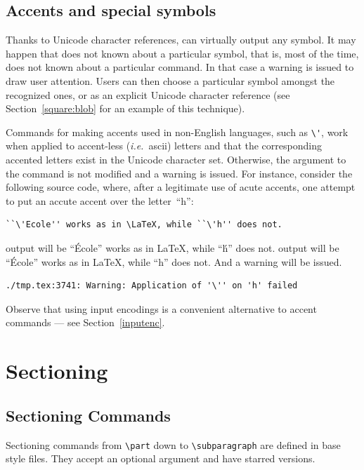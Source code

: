 \subsection{Accents\label{accents} and special symbols}
Thanks to Unicode character references, \hevea{} can virtually output
any symbol.
It may happen that \hevea{} does not known about a particular symbol,
that is, most of the time, \hevea{} does not known about a particular
command. In that case a warning is issued to draw user attention.
Users can then choose a particular symbol amongst the recognized ones,
or as an explicit Unicode character reference (see
Section~\ref{square:blob} for an example of this technique).

Commands for making accents used in non-English languages, such as
\verb+\'+, work when applied to accent-less (\emph{i.e.}\ ascii)
letters and that the corresponding accented letters exist
in the Unicode character set.
Otherwise, the argument to the command is not modified
and a warning is issued.
For instance, consider the following source code, where, after a
legitimate use of acute accents, one attempt to put an accute accent
over the letter~``h'':
\begin{verbatim}
``\'Ecole'' works as in \LaTeX, while ``\'h'' does not.
\end{verbatim}
\ifhevea
\hevea{} output will be ``\'Ecole'' works as in \LaTeX, while ``\'h'' does not.
\else
\hevea{} output will  be ``\'Ecole'' works as in \LaTeX, while ``h'' does not.
\fi{}
And a warning will be issued.
\begin{verbatim}
./tmp.tex:3741: Warning: Application of '\'' on 'h' failed
\end{verbatim}


Observe that using input encodings
is a convenient alternative to accent commands ---
see Section~\ref{inputenc}.

\section{Sectioning}

\subsection{\label{section:section}Sectioning Commands}
Sectioning commands from \verb+\part+ down to
\verb+\subparagraph+ are defined in base style files.
They accept an optional argument and have starred versions.



